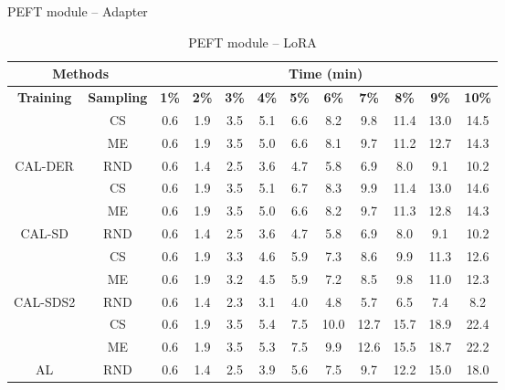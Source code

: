 \begin{table}[htbp]
\centering
\begin{subtable}{\linewidth}
\centering
\caption{PEFT module -- Adapter}

\begin{tabular}{c|c|cccccccccc}
\toprule
\multicolumn{2}{c|}{\textbf{Methods}} & \multicolumn{10}{c}{\textbf{Time (min)}} \\
\midrule
\textbf{Training} & \textbf{Sampling} & \textbf{1\%} & \textbf{2\%} & \textbf{3\%} & \textbf{4\%} & \textbf{5\%} & \textbf{6\%} & \textbf{7\%} & \textbf{8\%} & \textbf{9\%} & \textbf{10\%}\\
\midrule
 & CS & 0.6 & 1.9 & 3.5 & 5.1 & 6.6 & 8.2 & 9.8 & 11.4 & 13.0 & 14.5\\

 & ME & 0.6 & 1.9 & 3.5 & 5.0 & 6.6 & 8.1 & 9.7 & 11.2 & 12.7 & 14.3\\

\multirow{-3}{*}{\raggedright\arraybackslash CAL-DER} & RND & 0.6 & 1.4 & 2.5 & 3.6 & 4.7 & 5.8 & 6.9 & 8.0 & 9.1 & 10.2\\
\midrule
 & CS & 0.6 & 1.9 & 3.5 & 5.1 & 6.7 & 8.3 & 9.9 & 11.4 & 13.0 & 14.6\\

 & ME & 0.6 & 1.9 & 3.5 & 5.0 & 6.6 & 8.2 & 9.7 & 11.3 & 12.8 & 14.3\\

\multirow{-3}{*}{\raggedright\arraybackslash CAL-SD} & RND & 0.6 & 1.4 & 2.5 & 3.6 & 4.7 & 5.8 & 6.9 & 8.0 & 9.1 & 10.2\\
\midrule
 & CS & 0.6 & 1.9 & 3.3 & 4.6 & 5.9 & 7.3 & 8.6 & 9.9 & 11.3 & 12.6\\

 & ME & 0.6 & 1.9 & 3.2 & 4.5 & 5.9 & 7.2 & 8.5 & 9.8 & 11.0 & 12.3\\

\multirow{-3}{*}{\raggedright\arraybackslash CAL-SDS2} & RND & 0.6 & 1.4 & 2.3 & 3.1 & 4.0 & 4.8 & 5.7 & 6.5 & 7.4 & 8.2\\
\midrule
 & CS & 0.6 & 1.9 & 3.5 & 5.4 & 7.5 & 10.0 & 12.7 & 15.7 & 18.9 & 22.4\\

 & ME & 0.6 & 1.9 & 3.5 & 5.3 & 7.5 & 9.9 & 12.6 & 15.5 & 18.7 & 22.2\\

\multirow{-3}{*}{\raggedright\arraybackslash AL} & RND & 0.6 & 1.4 & 2.5 & 3.9 & 5.6 & 7.5 & 9.7 & 12.2 & 15.0 & 18.0\\
\bottomrule
\end{tabular}
\end{subtable}
\vspace{1em}
\begin{subtable}{\linewidth}
\centering
\caption{PEFT module -- LoRA}


\end{subtable}
\end{table}
